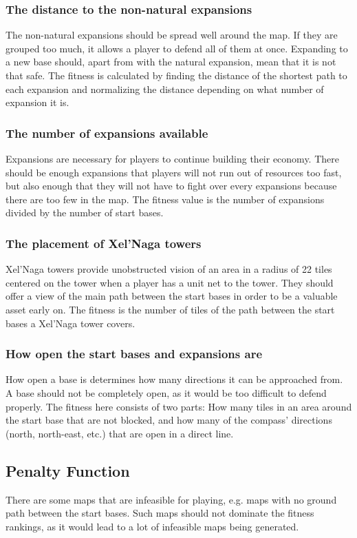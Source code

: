 	\subsubsection*{The distance to the non-natural expansions}
	The non-natural expansions should be spread well around the map. If they are grouped too much, it allows a player to defend all of them at once. Expanding to a new base should, apart from with the natural expansion, mean that it is not that safe. The fitness is calculated by finding the distance of the shortest path to each expansion and normalizing the distance depending on what number of expansion it is.

	\subsubsection*{The number of expansions available}
	Expansions are necessary for players to continue building their economy. There should be enough expansions that players will not run out of resources too fast, but also enough that they will not have to fight over every expansions because there are too few in the map. The fitness value is the number of expansions divided by the number of start bases.

	\subsubsection*{The placement of Xel'Naga towers}
	Xel'Naga towers provide unobstructed vision of an area in a radius of 22 tiles centered on the tower when a player has a unit net to the tower. They should offer a view of the main path between the start bases in order to be a valuable asset early on. The fitness is the number of tiles of the path between the start bases a Xel'Naga tower covers.

	\subsubsection*{How open the start bases and expansions are}
	How open a base is determines how many directions it can be approached from. A base should not be completely open, as it would be too difficult to defend properly. The fitness here consists of two parts: How many tiles in an area around the start base that are not blocked, and how many of the compass' directions (north, north-east, etc.) that are open in a direct line.

\subsection{Penalty Function}
\label{methodology_mapfitness_penalty}
There are some maps that are infeasible for playing, e.g. maps with no ground path between the start bases. Such maps should not dominate the fitness rankings, as it would lead to a lot of infeasible maps being generated. 

